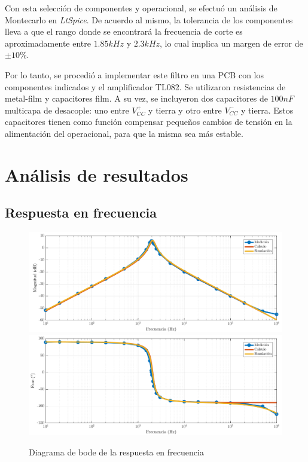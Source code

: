 \documentclass[../../tc_tp3_main.tex]{subfiles}
\begin{document}
Con esta selecci\'on de componentes y operacional, se efectu\'o un an\'alisis de Montecarlo en \textit{LtSpice}. De acuerdo al mismo, la tolerancia de los componentes lleva a que el rango donde se encontrar\'a la frecuencia de corte es aproximadamente entre $1.85kHz$ y $2.3kHz$, lo cual implica un margen de error de $\pm 10\%$. \par

Por lo tanto, se procedi\'o a implementar este filtro en una PCB con los componentes indicados y el amplificador TL082. Se utilizaron resistencias de metal-film y capacitores film. A su vez, se incluyeron dos capacitores de $100nF$ multicapa de desacople: uno entre $V_{CC}^+$ y tierra y otro entre $V_{CC}^-$ y tierra. Estos capacitores tienen como funci\'on compensar peque\~nos cambios de tensi\'on en la alimentaci\'on del operacional, para que la misma sea m\'as estable.


\section{An\'alisis de resultados}

\subsection{Respuesta en frecuencia}

\begin{figure}[h!]
	\centering
  	\includegraphics[scale = 0.5]{imagenes/tc_tp3_ej1_hf_mag.png}
  	\includegraphics[scale = 0.5]{imagenes/tc_tp3_ej1_hf_fase.png}
  	\caption{Diagrama de bode de la respuesta en frecuencia}
  	\label{fig:1-rtafrec}
\end{figure}
\end{document}
